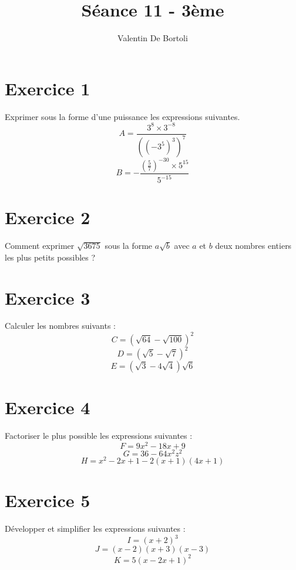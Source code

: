 \documentclass[10pt,a4paper]{article}
\title{Séance 11 - 3ème}
\author{Valentin De Bortoli}
\begin{document}
\maketitle
\section{Exercice 1}
Exprimer sous la forme d'une puissance les expressions suivantes.
\begin{equation}
A=\frac{3^8 \times 3^{-8}}{((-3^5)^3)^7}
\end{equation}
\begin{equation}
B=-\frac{(\frac{5}{7})^{-30} \times 5^{15}}{5^{-15}}
\end{equation}
\section{Exercice 2}
Comment exprimer $\sqrt{3675}$ sous la forme $a\sqrt{b}$ avec $a$ et $b$ deux nombres entiers les plus petits possibles ?
\section{Exercice 3}
Calculer les nombres suivants :
\begin{equation}
C=(\sqrt{64}-\sqrt{100})^2
\end{equation}
\begin{equation}
D=(\sqrt{5}-\sqrt{7})^2
\end{equation}
\begin{equation}
E=(\sqrt{3}-4\sqrt{4})\sqrt{6}
\end{equation}
\section{Exercice 4}
Factoriser le plus possible les expressions suivantes :
\begin{equation}
F=9x^2-18x+9
\end{equation}
\begin{equation}
G=36-64x^2z^2
\end{equation}
\begin{equation}
H=x^2-2x+1-2(x+1)(4x+1)
\end{equation}
\section{Exercice 5}
Développer et simplifier les expressions suivantes :
\begin{equation}
I=(x+2)^3
\end{equation}
\begin{equation}
J=(x-2)(x+3)(x-3)
\end{equation}
\begin{equation}
K=5(x-2x+1)^2
\end{equation}
\end{document}
